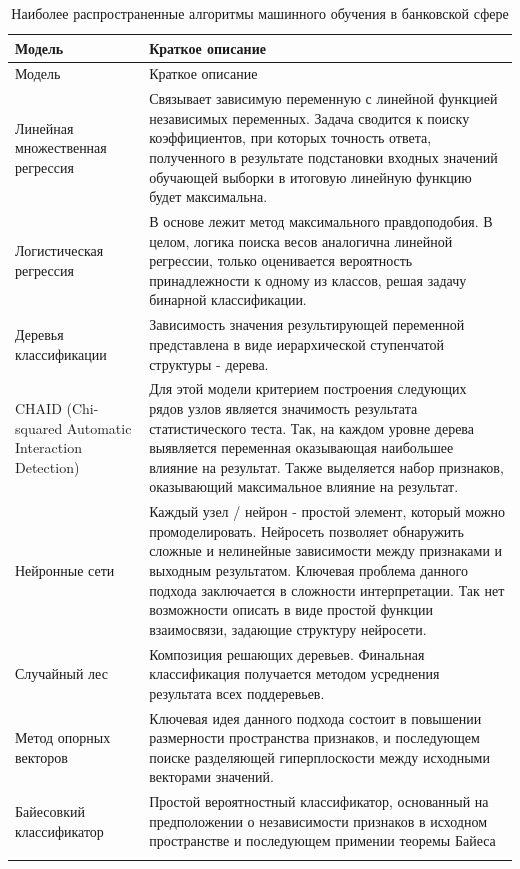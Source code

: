 \documentclass[12pt,a4paper]{article} %
\begin{document}
\begin{center}
	\begin{longtable}{p{5cm}|p{10cm}}
		\caption{Наиболее распространенные алгоритмы машинного обучения в банковской сфере}
		\label{Tab:1}\\
		\hline Модель & Краткое описание    \\
		\endfirsthead
		\hline Модель & Краткое описание    \\
		\endhead
		\hline Линейная множественная регрессия & Связывает зависимую переменную с линейной функцией независимых переменных. Задача сводится к поиску коэффициентов, при которых точность ответа, полученного в результате подстановки входных значений обучающей выборки в итоговую линейную функцию будет максимальна.  
		 \\
		 \hline
		Логистическая регрессия & В основе лежит метод максимального правдоподобия. В целом, логика поиска весов аналогична  линейной регрессии, только оценивается вероятность принадлежности к одному из классов, решая задачу бинарной классификации.
		  \\
		  \hline
		Деревья классификации 
		 & Зависимость значения результирующей переменной представлена в виде иерархической ступенчатой структуры - дерева. 
		  \\
		  \hline
		 CHAID (Chi-squared Automatic Interaction Detection)& Для этой модели критерием построения следующих рядов узлов является значимость результата статистического теста. Так, на каждом уровне дерева выявляется переменная оказывающая наибольшее влияние на результат. Также выделяется набор признаков, оказывающий максимальное влияние на результат.
		    \\
		\hline
		Нейронные сети&   
		 Каждый узел / нейрон - простой элемент, который можно промоделировать. Нейросеть позволяет обнаружить сложные и нелинейные зависимости между признаками и выходным результатом. Ключевая проблема данного подхода заключается в сложности интерпретации. Так нет возможности   описать в виде простой функции взаимосвязи, задающие структуру нейросети. \\
		 \hline
		Случайный лес&
		Композиция решающих деревьев. Финальная классификация получается методом усреднения результата всех поддеревьев.
		\\
		\hline
		Метод опорных векторов&
		Ключевая идея данного подхода состоит в повышении размерности пространства признаков, и последующем поиске разделяющей гиперплоскости между исходными векторами значений.
		\\
		\hline
		
		Байесовкий классификатор&Простой вероятностный классификатор, основанный на предположении о независимости признаков в исходном пространстве и последующем примении теоремы Байеса\\
		\\
		\hline 
	\end{longtable}

\end{center}
\end{document}
